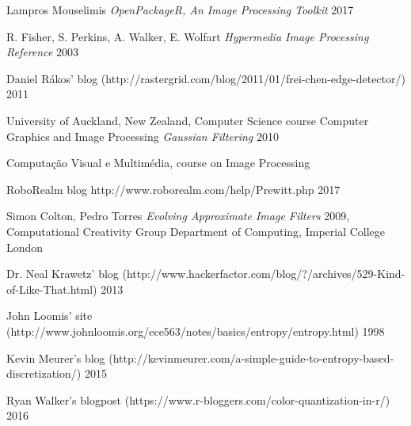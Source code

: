 \documentclass[12pt]{article}
\begin{document}
\begin{thebibliography}{1}

 Lampros Mouselimis {\em OpenPackageR, An Image Processing Toolkit} 2017

 R. Fisher, S. Perkins, A. Walker, E. Wolfart {\em Hypermedia Image Processing Reference} 2003

 Daniel R\'akos' blog (http://rastergrid.com/blog/2011/01/frei-chen-edge-detector/) 2011

 University of Auckland, New Zealand, Computer Science course Computer Graphics and Image Processing {\em Gaussian Filtering} 2010

 Computaç\~ao Visual e Multimédia, course on Image Processing

 RoboRealm blog {http://www.roborealm.com/help/Prewitt.php} 2017

 Simon Colton, Pedro Torres {\em Evolving Approximate Image Filters} 2009, Computational Creativity Group
Department of Computing, Imperial College London

 Dr. Neal Krawetz' blog (http://www.hackerfactor.com/blog/?/archives/529-Kind-of-Like-That.html) 2013

 John Loomis' site (http://www.johnloomis.org/ece563/notes/basics/entropy/entropy.html) 1998

 Kevin Meurer's blog (http://kevinmeurer.com/a-simple-guide-to-entropy-based-discretization/) 2015

 Ryan Walker's blogpost (https://www.r-bloggers.com/color-quantization-in-r/) 2016

\end{thebibliography}
\end{document}
